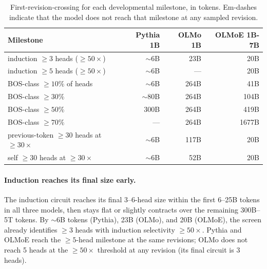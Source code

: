 \documentclass[11pt]{article}
\begin{document}
\begin{table}[t]
\centering
\caption{First-revision-crossing for each developmental milestone, in tokens.
Em-dashes indicate that the model does not reach that milestone at any
sampled revision.}
\label{tab:milestones}
\small
\begin{tabular}{l r r r}
\toprule
Milestone & Pythia 1B & OLMo 1B & OLMoE 1B-7B \\
\midrule
induction $\ge 3$ heads ($\ge 50\times$) & $\sim$6B    & 23B  & 20B \\
induction $\ge 5$ heads ($\ge 50\times$) & $\sim$6B    & ---  & 20B \\
BOS-class $\ge 10\%$ of heads            & $\sim$6B    & 264B & 41B \\
BOS-class $\ge 30\%$                     & $\sim$80B   & 264B & 104B \\
BOS-class $\ge 50\%$                     & 300B        & 264B & 419B \\
BOS-class $\ge 70\%$                     & ---         & 264B & 1677B \\
previous-token $\ge 30$ heads at $\ge 30\times$ & $\sim$6B & 117B & 20B \\
self $\ge 30$ heads at $\ge 30\times$    & $\sim$6B    & 52B  & 20B \\
\bottomrule
\end{tabular}
\end{table}

\paragraph{Induction reaches its final size early.} The induction circuit
reaches its final 3--6-head size within the first 6--25B tokens in all
three models, then stays flat or slightly contracts over the remaining
300B--5T tokens. By $\sim$6B tokens (Pythia), 23B (OLMo), and 20B (OLMoE),
the screen already identifies $\ge\!3$ heads with induction selectivity
$\ge\!50\times$. Pythia and OLMoE reach the $\ge\!5$-head milestone at the
same revisions; OLMo does not reach 5 heads at the $\ge\!50\times$
threshold at any revision (its final circuit is 3 heads).
\end{document}
